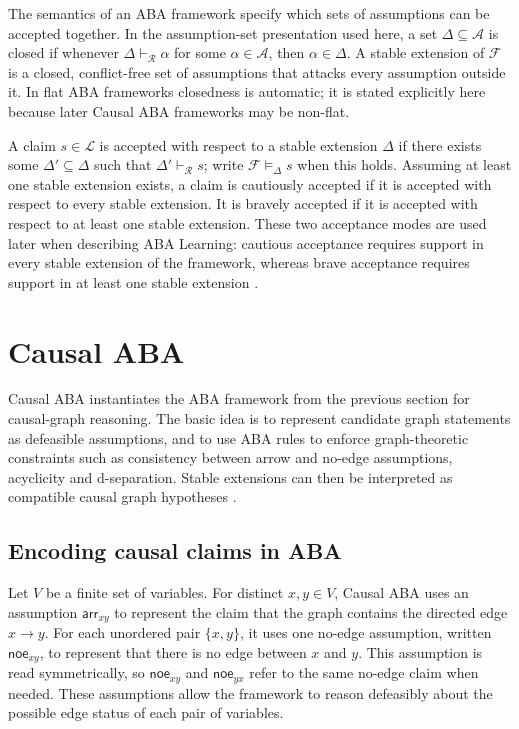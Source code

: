 The semantics of an ABA framework specify which sets of assumptions can be accepted together. In the assumption-set presentation used here, a set \(\Delta \subseteq \mathcal{A}\) is closed if whenever \(\Delta \vdash_{\mathcal{R}} \alpha\) for some \(\alpha \in \mathcal{A}\), then \(\alpha \in \Delta\). A stable extension of \(\mathcal{F}\) is a closed, conflict-free set of assumptions that attacks every assumption outside it. In flat ABA frameworks closedness is automatic; it is stated explicitly here because later Causal ABA frameworks may be non-flat.

A claim \(s \in \mathcal{L}\) is accepted with respect to a stable extension \(\Delta\) if there exists some \(\Delta' \subseteq \Delta\) such that \(\Delta' \vdash_{\mathcal{R}} s\); write \(\mathcal{F} \models_{\Delta} s\) when this holds. Assuming at least one stable extension exists, a claim is cautiously accepted if it is accepted with respect to every stable extension. It is bravely accepted if it is accepted with respect to at least one stable extension. These two acceptance modes are used later when describing ABA Learning: cautious acceptance requires support in every stable extension of the framework, whereas brave acceptance requires support in at least one stable extension \cite{de2023aba,de2024learning}.

\section{Causal ABA}
Causal ABA instantiates the ABA framework from the previous section for causal-graph reasoning. The basic idea is to represent candidate graph statements as defeasible assumptions, and to use ABA rules to enforce graph-theoretic constraints such as consistency between arrow and no-edge assumptions, acyclicity and d-separation. Stable extensions can then be interpreted as compatible causal graph hypotheses \cite{russo2024argumentative}.

\subsection{Encoding causal claims in ABA}

Let \(V\) be a finite set of variables. For distinct \(x,y \in V\), Causal ABA uses an assumption \(\mathsf{arr}_{xy}\) to represent the claim that the graph contains the directed edge \(x \to y\). For each unordered pair \(\{x,y\}\), it uses one no-edge assumption, written \(\mathsf{noe}_{xy}\), to represent that there is no edge between \(x\) and \(y\). This assumption is read symmetrically, so \(\mathsf{noe}_{xy}\) and \(\mathsf{noe}_{yx}\) refer to the same no-edge claim when needed. These assumptions allow the framework to reason defeasibly about the possible edge status of each pair of variables.

